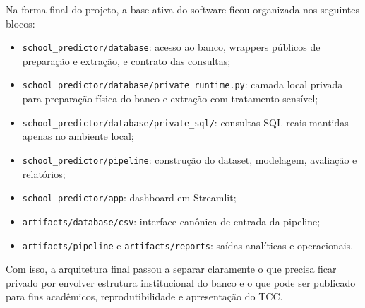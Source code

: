 Na forma final do projeto, a base ativa do software ficou organizada nos seguintes blocos:

\begin{itemize}
    \item \texttt{school\_predictor/database}: acesso ao banco, wrappers p\'ublicos de prepara\c{c}\~ao e extra\c{c}\~ao, e contrato das consultas;
    \item \texttt{school\_predictor/database/private\_runtime.py}: camada local privada para prepara\c{c}\~ao f\'isica do banco e extra\c{c}\~ao com tratamento sens\'ivel;
    \item \texttt{school\_predictor/database/private\_sql/}: consultas SQL reais mantidas apenas no ambiente local;
    \item \texttt{school\_predictor/pipeline}: constru\c{c}\~ao do dataset, modelagem, avalia\c{c}\~ao e relat\'orios;
    \item \texttt{school\_predictor/app}: dashboard em Streamlit;
    \item \texttt{artifacts/database/csv}: interface can\^onica de entrada da pipeline;
    \item \texttt{artifacts/pipeline} e \texttt{artifacts/reports}: sa\'idas anal\'iticas e operacionais.
\end{itemize}

Com isso, a arquitetura final passou a separar claramente o que precisa ficar privado por envolver estrutura institucional do banco e o que pode ser publicado para fins acad\^emicos, reprodutibilidade e apresenta\c{c}\~ao do TCC.
